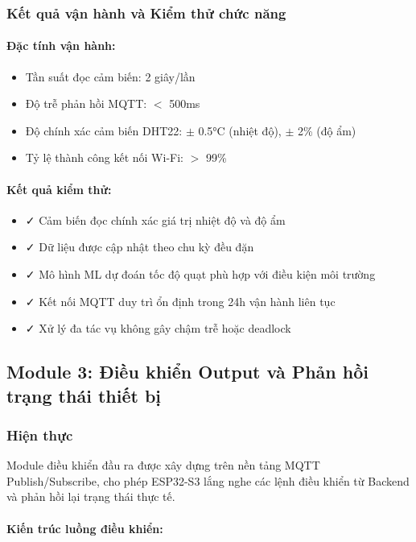 \subsubsection{Kết quả vận hành và Kiểm thử chức năng}

\paragraph{Đặc tính vận hành:}
\begin{itemize}
    \item Tần suất đọc cảm biến: 2 giây/lần
    \item Độ trễ phản hồi MQTT: $<$ 500ms
    \item Độ chính xác cảm biến DHT22: $\pm$ 0.5°C (nhiệt độ), $\pm$ 2\% (độ ẩm)
    \item Tỷ lệ thành công kết nối Wi-Fi: $>$ 99\%
\end{itemize}

\paragraph{Kết quả kiểm thử:}
\begin{itemize}
    \item ✓ Cảm biến đọc chính xác giá trị nhiệt độ và độ ẩm
    \item ✓ Dữ liệu được cập nhật theo chu kỳ đều đặn
    \item ✓ Mô hình ML dự đoán tốc độ quạt phù hợp với điều kiện môi trường
    \item ✓ Kết nối MQTT duy trì ổn định trong 24h vận hành liên tục
    \item ✓ Xử lý đa tác vụ không gây chậm trễ hoặc deadlock
\end{itemize}

\subsection{Module 3: Điều khiển Output và Phản hồi trạng thái thiết bị}

\subsubsection{Hiện thực}

Module điều khiển đầu ra được xây dựng trên nền tảng MQTT Publish/Subscribe, cho phép ESP32-S3 lắng nghe các lệnh điều khiển từ Backend và phản hồi lại trạng thái thực tế.

\paragraph{Kiến trúc luồng điều khiển:}

